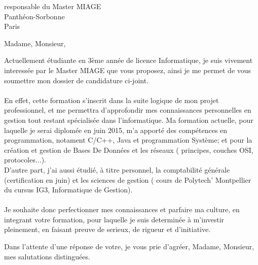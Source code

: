 \documentclass[a4paper]{lettre}
\begin{document}
\begin{letter}{responsable du Master MIAGE\\Panthéon-Sorbonne\\Paris}
\signature{Tamara }
\nofax
{}
\address{Tamara \\64, avenue de Lodève\\34070 Montpellier}
\date{23 sept. 2015}

\opening{Madame, Monsieur,}
Actuellement étudiante en 3ème année de licence Informatique, je suis vivement interessée par le Master MIAGE que vous proposez, ainsi je me permet de vous soumettre mon dossier de candidature ci-joint.\\
\\
En effet, cette formation s'inscrit dans la suite logique de mon projet professionnel, et me permettra d'approfondir mes connaissances personnelles en gestion tout restant spécialisée dans l'informatique.
Ma formation actuelle, pour laquelle je serai diplomée en juin 2015, m'a apporté des compétences en programmation, notament C/C++, Java et programmation Système; et pour la création et gestion de Bases De Données et les réseaux ( principes, couches OSI, protocoles...).\\
D'autre part, j'ai aussi étudié, à titre personnel, la comptabilité générale (certification en juin) et les sciences de gestion ( cours de Polytech' Montpellier du cursus IG3, Informatique de Gestion).\\
\\
Je souhaite donc perfectionner mes connaissances et parfaire ma culture, en integrant votre formation, pour laquelle je suis determinée à m'investir pleinement, en faisant preuve de serieux, de rigueur et d'initiative.\\


\closing{Dans l'attente d'une réponse de votre, je vous prie d'agréer, Madame, Monsieur, mes salutations distinguées.}
\end{letter}
\end{document}
